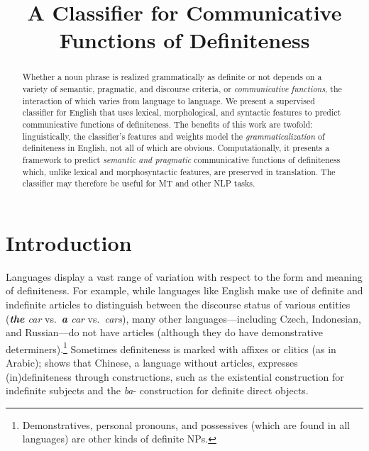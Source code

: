 \documentclass[11pt,letterpaper]{article}
\title{\draftnotice{Title, author list not final. Page limit: 5 + 2 bib}A Classifier for Communicative Functions of Definiteness}
\date{}
\newcommand{\ensuretext}[1]{#1}
\newcommand{\abmarker}{\ensuretext{\textcolor{red}{\ensuremath{^{\textsc{A}}_{\textsc{B}}}}}}
\newcommand{\arkcomment}[3]{\ensuretext{\textcolor{#3}{[#1 #2]}}}
\newcommand{\ab}[1]{\arkcomment{\abmarker}{#1}{red}}
\begin{document}
\maketitle
\begin{abstract}
Whether a noun phrase is realized grammatically as definite or not 
depends on a variety of semantic, pragmatic, and discourse criteria, or {\em communicative functions}, 
the interaction of which varies from language to language.
We present a supervised classifier for English that uses lexical, morphological, and syntactic features 
to predict communicative functions of definiteness.   
The benefits of this work are twofold: linguistically, the classifier's features and weights 
model the {\em grammaticalization} of definiteness in English, 
not all of which are obvious.
Computationally, it presents a framework to predict \textit{semantic and pragmatic} communicative functions of definiteness 
which, unlike lexical and morphosyntactic features, are preserved in translation.  
The classifier may therefore be useful for MT
and other NLP tasks. 
\end{abstract}

\section{Introduction}

Languages display a vast range of variation with respect to the form and meaning of definiteness. 
For example, while languages like English make use of definite and indefinite articles 
to distinguish between the discourse status of various entities ({\it \textbf{the} car} vs.~{\it \textbf{a} car} vs.~{\it cars}), 
many other languages---including Czech, Indonesian, and Russian---do not have articles
(although they do have demonstrative determiners).\footnote{Demonstratives, personal pronouns, and possessives (which are found in all languages) are other kinds of definite NPs. }  
Sometimes definiteness is marked with affixes or clitics (as in Arabic);  
\citet{chen04} shows that Chinese, a language without articles, expresses (in)definiteness through constructions, 
such as the existential construction for indefinite subjects and the {\it ba}- construction for definite direct objects. 
\end{document}
